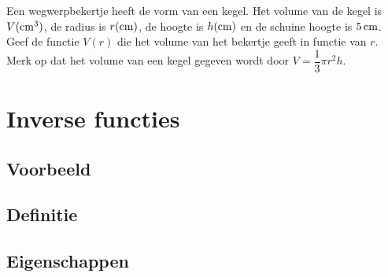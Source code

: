 \documentclass[12pt,twoside]{article}
\begin{document}
\begin{oefening} %
Een wegwerpbekertje heeft de vorm van een kegel. Het volume van de kegel is $V (\cm^3)$, de radius is $r (\cm)$, de hoogte is $h (\cm)$ en de schuine hoogte is $5 \cm$. Geef de functie $V(r)$ die het volume van het bekertje geeft in functie van $r$. Merk op dat het volume van een kegel gegeven wordt door $V=\dfrac{1}{3}\pi r^2 h$.
\end{oefening}

\pagebreak
\section{Inverse functies}

\subsection{Voorbeeld}

\subsection{Definitie}

\subsection{Eigenschappen}
\end{document}
